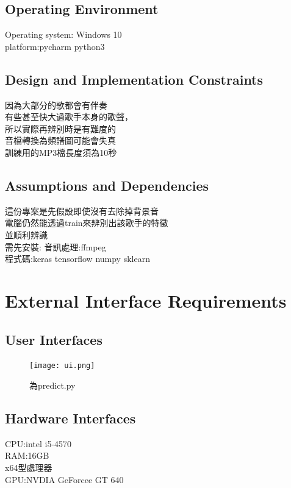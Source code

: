 \documentclass{article}
\begin{document}
\begin{CJK}{UTF8}{bkai}
\subsection{\Large Operating Environment \\}
 \Large Operating system: Windows 10\\
platform:pycharm python3\\

\subsection{\Large Design and Implementation Constraints\\}
   \Large 因為大部分的歌都會有伴奏 \\
有些甚至快大過歌手本身的歌聲，\\
所以實際再辨別時是有難度的\\
音檔轉換為頻譜圖可能會失真\\
訓練用的MP3檔長度須為10秒
\subsection{\Large  Assumptions and Dependencies\\}
  \Large  這份專案是先假設即使沒有去除掉背景音\\
 電腦仍然能透過train來辨別出該歌手的特徵\\
並順利辨識\\
需先安裝:
音訊處理:ffmpeg\\
程式碼:keras tensorflow numpy sklearn
\newpage

\section{\huge\bf  \color{blue} External Interface Requirements\\}
\subsection{\Large User Interfaces\\}
\begin{figure}[h]
\begin{center}
\texttt{[image: ui.png]}
\end{center}
\caption{為predict.py}
\label{fig:4}
\end{figure}
\subsection{\Large Hardware Interfaces\\}
CPU:intel i5-4570\\
RAM:16GB\\
x64型處理器\\
GPU:NVDIA GeForcee GT 640\\


\end{CJK}
\end{document}
